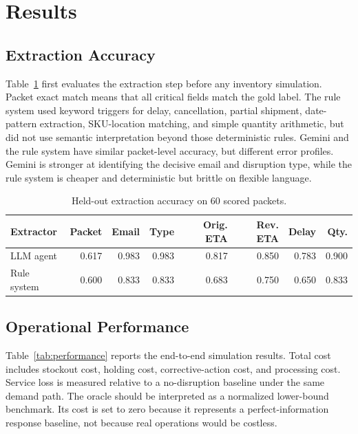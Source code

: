 \documentclass[11pt]{article}
\begin{document}
\section{Results}

\subsection{Extraction Accuracy}

Table~\ref{tab:extract} first evaluates the extraction step before any inventory simulation. Packet exact match means that all critical fields match the gold label. The rule system used keyword triggers for delay, cancellation, partial shipment, date-pattern extraction, SKU-location matching, and simple quantity arithmetic, but did not use semantic interpretation beyond those deterministic rules. Gemini and the rule system have similar packet-level accuracy, but different error profiles. Gemini is stronger at identifying the decisive email and disruption type, while the rule system is cheaper and deterministic but brittle on flexible language.

\begin{table}[H]
\centering
\caption{Held-out extraction accuracy on 60 scored packets.}
\label{tab:extract}
\small
\begin{tabular}{lrrrrrrr}
\toprule
Extractor & Packet & Email & Type & Orig. ETA & Rev. ETA & Delay & Qty. \\
\midrule
LLM agent & 0.617 & 0.983 & 0.983 & 0.817 & 0.850 & 0.783 & 0.900 \\
Rule system & 0.600 & 0.833 & 0.833 & 0.683 & 0.750 & 0.650 & 0.833 \\
\bottomrule
\end{tabular}
\end{table}

\subsection{Operational Performance}

Table~\ref{tab:performance} reports the end-to-end simulation results. Total cost includes stockout cost, holding cost, corrective-action cost, and processing cost. Service loss is measured relative to a no-disruption baseline under the same demand path. The oracle should be interpreted as a normalized lower-bound benchmark. Its cost is set to zero because it represents a perfect-information response baseline, not because real operations would be costless.
\end{document}
